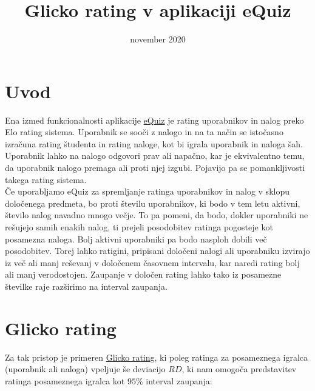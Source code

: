 \documentclass{IEEEtran}
\title{Glicko rating v aplikaciji eQuiz}
\date{november 2020}
\begin{document}
\maketitle

\section{Uvod}
\label{sec:intro}
Ena izmed funkcionalnosti aplikacije \href{https://equiz.fri1.uni-lj.si}{eQuiz} 
je rating uporabnikov in nalog preko Elo rating sistema. Uporabnik se sooči z nalogo in na ta način se istočasno izračuna rating študenta in rating naloge, kot bi igrala uporabnik in naloga šah. Uporabnik lahko na nalogo odgovori prav ali napačno, kar je ekvivalentno temu, da uporabnik nalogo premaga ali proti njej izgubi. 
Pojavijo pa se pomankljivosti takega rating sistema. 
\hfill
\\
Če uporabljamo eQuiz za spremljanje ratinga uporabnikov in nalog v sklopu določenega predmeta, bo proti številu uporabnikov, ki bodo v tem letu aktivni, število nalog navadno mnogo večje. To pa pomeni, da bodo, dokler uporabniki ne rešujejo samih enakih nalog, ti prejeli posodobitev ratinga pogosteje kot posamezna naloga. Bolj aktivni uporabniki pa bodo nasploh dobili več posodobitev.
Torej lahko ratigini, pripisani določeni nalogi ali uporabniku izvirajo iz več ali manj reševanj v določenem časovnem intervalu, kar naredi rating bolj ali manj verodostojen.
Zaupanje v določen rating lahko tako iz posamezne številke raje razširimo na interval zaupanja.
\section{Glicko rating}
\label{sec:glicko}
Za tak pristop je primeren \href{http://www.glicko.net/glicko/glicko.pdf}{Glicko rating}, ki poleg ratinga za posameznega igralca (uporabnik ali naloga) vpeljuje še deviacijo $RD$, ki nam omogoča predstavitev ratinga posameznega igralca kot $95\%$ interval zaupanja:
\end{document}
